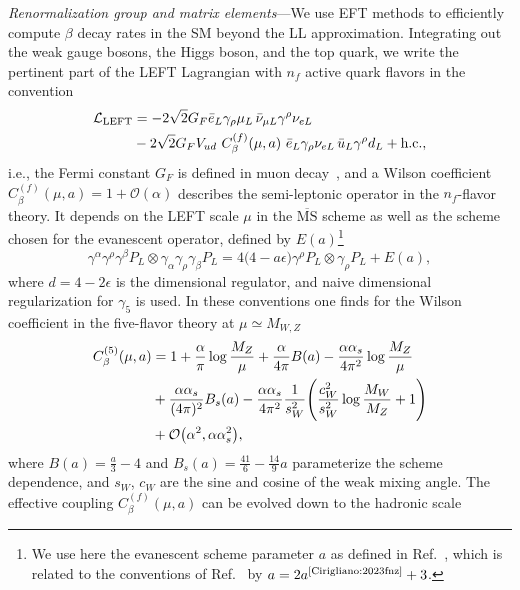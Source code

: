 \documentclass[prl,twocolumn,twoside,preprintnumbers,superscriptaddress,nofootinbib,letterpaper]{revtex4-1}
\newcommand{\eps}{\epsilon}
\newcommand{\Order}{\mathcal{O}}
\newcommand{\beq}{\begin{equation}}
\newcommand{\eeq}{\end{equation}}
\begin{document}
\emph{Renormalization group and matrix elements}---We use EFT methods to efficiently compute  $\beta$ decay rates in the SM
beyond the LL approximation.
Integrating out the weak gauge bosons, the Higgs boson, and the top quark,
we write the pertinent part of the LEFT Lagrangian with
$n_f$ active quark flavors in the convention
\begin{align}
{\mathcal L}_\text{LEFT}&=-2\sqrt{2}G_F\bar e_L\gamma_\rho\mu_L\,\bar\nu_{\mu L}\gamma^\rho \nu_{eL}
\label{eq:LEFT1}
\\
 &-2\sqrt{2}G_F V_{ud} \ C^{(f)}_\beta(\mu,a) \ \bar e_L\gamma_\rho \nu_{eL}\,\bar u_L\gamma^\rho d_L+\text{h.c.},
\notag
\end{align}
i.e., the Fermi constant $G_F$ is defined in muon decay~\cite{MuLan:2012sih}, and a Wilson coefficient $C_\beta^{(f)} (\mu,a)=1+\Order(\alpha)$ describes the semi-leptonic operator in the $n_f$-flavor theory. It depends on the LEFT scale $\mu$ in the $\overline{\text{MS}}$ scheme as well as the scheme chosen for the evanescent operator, defined by
$E(a)$\footnote{We use here
the evanescent scheme parameter $a$ as defined in Ref.~\cite{Gorbahn:2025ssv}, which is related to the conventions of Ref.~\cite{Cirigliano:2023fnz} by $a = 2 a^\text{\cite{Cirigliano:2023fnz}} + 3$.}
\beq
\gamma^\alpha\gamma^\rho\gamma^\beta P_L\otimes \gamma_\alpha \gamma_\rho\gamma_\beta P_L=4\big(4 -a \epsilon \big) \gamma^\rho P_L\otimes \gamma_\rho P_L + E(a),
\eeq
where $d=4-2\eps$ is the dimensional regulator, and naive dimensional regularization for $\gamma_5$ is used. In these conventions one finds for the Wilson coefficient
in the five-flavor theory at $\mu \simeq M_{W, Z}$~\cite{Sirlin:1981ie,Brod:2008ss,Dekens:2019ept,Hill:2019xqk,Cirigliano:2023fnz,Gorbahn:2025ssv}
\begin{align}
C_\beta^{(5)}(\mu,a)&= 1+\frac{\alpha}{\pi}\log\frac{M_Z}{\mu}+\frac{\alpha}{4 \pi}B(a)-\frac{\alpha\alpha_s}{4\pi^2}\log\frac{M_Z}{\mu}\notag\\
&+ \frac{\alpha\alpha_s}{(4\pi)^2} B_s (a)
- \frac{\alpha\alpha_s}{4\pi^2} \frac{1}{s_{W}^{2}}\Bigg( \frac{c_{W}^{2}}{s_W^2} \log\frac{M_W}{M_Z}+1\Bigg)\notag\\
&+\Order\big(\alpha^2,\alpha\alpha_s^{2}\big) ,
\label{eq:Cmatch}
\end{align}
where $B(a)=\frac{a}{3}-4$ and $B_s(a)=\frac{41}{6}-\frac{14}{9}a$
parameterize the scheme dependence, and $s_{W}$, $c_{W}$ are the sine and cosine of the weak mixing angle.
The effective coupling $C_\beta^{(f)} (\mu, a)$ can be evolved down to the hadronic scale
\end{document}
